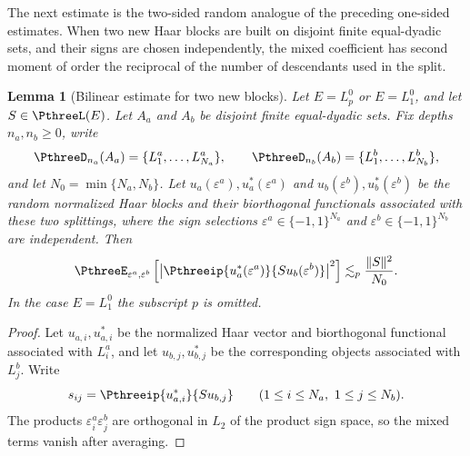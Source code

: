 \documentclass[11pt,reqno]{amsart}
\makeatletter
\theoremstyle{plain}
\newtheorem{lemma}[lemma]{Lemma}
\theoremstyle{definition}
\newcounter{problempaper}
\newenvironment{problempaperbody}{%
  \setcounter{subsection}{0}%
  \setcounter{subsubsection}{0}%
  \setcounter{paragraph}{0}%
  \renewcommand{\thesubsection}{\arabic{subsection}}%
  \renewcommand{\thesubsubsection}{\thesubsection.\arabic{subsubsection}}%
  \renewcommand{\theparagraph}{\thesubsubsection.\arabic{paragraph}}%
  \let\problem@outersection\section
  \let\problem@outersubsection\subsection
  \let\problem@outersubsubsection\subsubsection
  \let\problem@outerparagraph\paragraph
  \let\section\problem@papersection
  \let\subsection\problem@papersubsection
  \let\subsubsection\problem@papersubsubsection
}{%
  \let\section\problem@outersection
  \let\subsection\problem@outersubsection
  \let\subsubsection\problem@outersubsubsection
  \let\paragraph\problem@outerparagraph
}
\newcommand{\problem@target}[2]{%
  \hypertarget{problem-\theproblempaper-#1-#2}{}%
}
\newcommand{\problem@paperheading}[3]{%
  \par\bigskip
  \problem@target{#1}{#2}%
  \noindent{\large\bfseries #2.\quad #3\par}%
  \nobreak\smallskip
}
\newcommand{\problem@papersubheading}[3]{%
  \par\medskip
  \problem@target{#1}{#2}%
  \noindent{\normalsize\bfseries #2.\quad #3\par}%
  \nobreak\smallskip
}
\newcommand{\problem@papersubsubheading}[3]{%
  \par\smallskip
  \problem@target{#1}{#2}%
  \noindent{\normalsize\itshape #2.\quad #3.\ }%
}
\def\problem@papersection{%
  \@ifstar{\problem@papersectionstar}{\problem@papersectionnostar}%
}
\def\problem@papersectionstar#1{%
  \par\bigskip\noindent{\large\bfseries #1\par}\nobreak\smallskip
}
\def\problem@papersectionnostar#1{%
  \refstepcounter{subsection}%
  \setcounter{subsubsection}{0}%
  \setcounter{paragraph}{0}%
  \problem@paperheading{section}{\thesubsection}{#1}%
  \problem@writecontentsline{section}{\thesubsection}{#1}%
}
\def\problem@papersubsection{%
  \@ifstar{\problem@papersubsectionstar}{\problem@papersubsectionnostar}%
}
\def\problem@papersubsectionstar#1{%
  \par\medskip\noindent{\normalsize\bfseries #1\par}\nobreak\smallskip
}
\def\problem@papersubsectionnostar#1{%
  \refstepcounter{subsubsection}%
  \setcounter{paragraph}{0}%
  \problem@papersubheading{subsection}{\thesubsubsection}{#1}%
  \problem@writecontentsline{subsection}{\thesubsubsection}{#1}%
}
\def\problem@papersubsubsection{%
  \@ifstar{\problem@papersubsubsectionstar}{\problem@papersubsubsectionnostar}%
}
\def\problem@papersubsubsectionstar#1{%
  \par\smallskip\noindent{\normalsize\itshape #1.\ }%
}
\def\problem@papersubsubsectionnostar#1{%
  \refstepcounter{paragraph}%
  \problem@papersubsubheading{subsubsection}{\theparagraph}{#1}%
  \problem@writecontentsline{subsubsection}{\theparagraph}{#1}%
}
\newcommand{\problem@writecontentsline}[3]{%
  \begingroup
  \protected@write\@auxout{}{%
    \string\problemcontentsentry{\theproblempaper}{#1}{#2}{#3}{\thepage}%
  }%
  \endgroup
}
\newcommand{\problemcontentsentry}[5]{%
  \@ifundefined{problemcontents@#1}{%
    \expandafter\gdef\csname problemcontents@#1\endcsname{}%
  }{}%
  \expandafter\g@addto@macro\csname problemcontents@#1\endcsname{%
    \problemcontentsline{#1}{#2}{#3}{#4}{#5}%
  }%
}
\newcommand{\problemcontentslink}[4]{%
  \hyperlink{problem-#1-#2-#3}{#4}%
}
\newcommand{\problemcontentsline}[5]{%
  \ifstrequal{#2}{section}{%
    \par\noindent
    \problemcontentslink{#1}{#2}{#3}{\makebox[2.5em][l]{#3}#4}%
    \nobreak\dotfill
    \problemcontentslink{#1}{#2}{#3}{#5}\par
  }{%
    \ifstrequal{#2}{subsection}{%
      \par\noindent\hspace*{1.5em}%
      \problemcontentslink{#1}{#2}{#3}{\makebox[3.5em][l]{#3}#4}%
      \nobreak\dotfill
      \problemcontentslink{#1}{#2}{#3}{#5}\par
    }{%
      \par\noindent\hspace*{3em}%
      \problemcontentslink{#1}{#2}{#3}{\makebox[4.5em][l]{#3}#4}%
      \nobreak\dotfill
      \problemcontentslink{#1}{#2}{#3}{#5}\par
    }%
  }%
}
\makeatother
\begin{document}
\begin{problempaperbody}
The next estimate is the two-sided random analogue of the preceding one-sided estimates. When two new Haar blocks are built on disjoint finite equal-dyadic sets, and their signs are chosen independently, the mixed coefficient has second moment of order the reciprocal of the number of descendants used in the split.

\begin{lemma}[Bilinear estimate for two new blocks]
\label{p3:lem:bilinear}
Let $E=L_p^0$ or $E=L_1^0$, and let $S\in\PthreeL(E)$. Let $A_a$ and $A_b$ be disjoint finite equal-dyadic sets. Fix depths $n_a,n_b\geq0$, write
\begin{equation*}
        \PthreeD_{n_a}(A_a)=\{L_1^a,\ldots,L_{N_a}^a\},\qquad \PthreeD_{n_b}(A_b)=\{L_1^b,\ldots,L_{N_b}^b\},
\end{equation*}
and let $N_0 = \min \{ N_a,N_b \}$. Let $u_a(\varepsilon^a),u_a^*(\varepsilon^a)$ and $u_b(\varepsilon^b),u_b^*(\varepsilon^b)$ be the random normalized Haar blocks and their biorthogonal functionals associated with these two splittings, where the sign selections $\varepsilon^a\in\{-1,1\}^{N_a}$ and $\varepsilon^b\in\{-1,1\}^{N_b}$ are independent. Then
\begin{equation*}
        \PthreeE_{\varepsilon^a,\varepsilon^b}\left[\left|\Pthreeip{u_a^*(\varepsilon^a)}{S u_b(\varepsilon^b)}\right|^2\right]\lesssim_p \frac{\|S\|^2}{N_0}.
\end{equation*}
In the case $E=L_1^0$ the subscript $p$ is omitted.
\end{lemma}

\begin{proof}
Let $u_{a,i},u_{a,i}^*$ be the normalized Haar vector and biorthogonal functional associated with $L_i^a$, and let $u_{b,j},u_{b,j}^*$ be the corresponding objects associated with $L_j^b$. Write
\begin{equation*}
        s_{ij}=\Pthreeip{u_{a,i}^*}{S u_{b,j}}\qquad(1\leq i\leq N_a,\ 1\leq j\leq N_b).
\end{equation*}
The products $\varepsilon_i^a\varepsilon_j^b$ are orthogonal in $L_2$ of the product sign space, so the mixed terms vanish after averaging.


\end{proof}
\end{problempaperbody}
\end{document}
